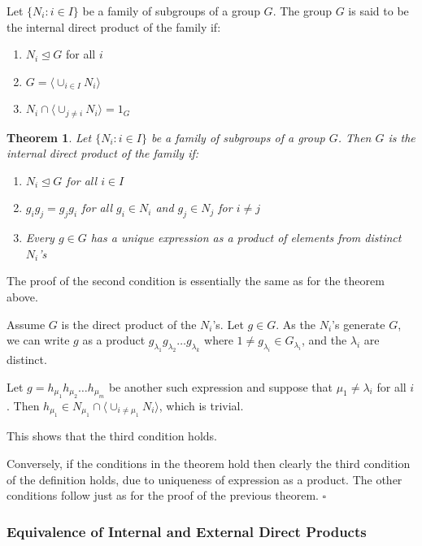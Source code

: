 \documentclass[10pt]{article}
\newtheorem{theorem}{Theorem}[section]
\newenvironment{proof}[1][Proof]{\begin{trivlist}
\item[\hskip \labelsep {\itshape #1}]}{\end{trivlist}}
\newenvironment{definition}[1][Definition]{\begin{trivlist}
\item[\hskip \labelsep {\bfseries #1}]}{\end{trivlist}}
\begin{document}
\begin{definition}
Let $\{N_i : i \in I\}$ be a family of subgroups of a group $G$. The group $G$ is said to be the internal direct product of the family if:
\begin{enumerate}
\item $N_i \mathrel{\unlhd} G$ for all $i$
\item $G = \langle \cup_{i\in I} N_i \rangle$
\item $N_i \cap \langle \cup_{j \neq i} N_i \rangle = 1_G$
\end{enumerate}
\end{definition}

\begin{theorem}
Let $\{N_i : i \in I\}$ be a family of subgroups of a group $G$. Then $G$ is the internal direct product of the family if:
\begin{enumerate}
\item $N_i \mathrel{\unlhd} G$ for all $i \in I$
\item $g_ig_j = g_jg_i$ for all $g_i \in N_i$ and $g_j \in N_j$ for $i \neq j$
\item Every $g \in G$ has a unique expression as a product of elements from distinct $N_i$'s
\end{enumerate}
\end{theorem}

\begin{proof}
The proof of the second condition is essentially the same as for the theorem above.

Assume $G$ is the direct product of the $N_i$'s. Let $g \in G$. As the $N_i$'s generate $G$, we can write $g$ as a product $g_{\lambda_1}g_{\lambda_2}\ldots g_{\lambda_k}$ where $1 \neq g_{\lambda_i} \in G_{\lambda_i}$, and the $\lambda_i$ are distinct. 

Let $g = h_{\mu_1}h_{\mu_2}\ldots h_{\mu_m}$ be another such expression and suppose that $\mu_1 \neq \lambda_i$ for all $i$. Then $h_{\mu_1} \in N_{\mu_1} \cap \langle \cup_{i \neq \mu_1} N_i \rangle$, which is trivial.

This shows that the third condition holds.

Conversely, if the conditions in the theorem hold then clearly the third condition of the definition holds, due to uniqueness of expression as a product. The other conditions follow just as for the proof of the previous theorem. $\square$
\end{proof}

\subsubsection{Equivalence of Internal and External Direct Products}
\end{document}
